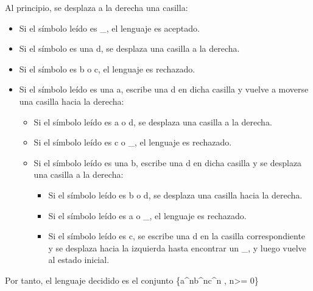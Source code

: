 \documentclass[11pt, a4paper, titlepage]{article}
\begin{document}
Al principio, se desplaza a la derecha una casilla:
\begin{itemize}
\item Si el símbolo leído es \_, el lenguaje es aceptado.
\item Si el símbolo es una d, se desplaza una casilla a la derecha.
\item Si el símbolo es b o c, el lenguaje es rechazado.
\item Si el símbolo leído es una a, escribe una d en dicha casilla
  y vuelve a moverse una casilla hacia la derecha:
  \begin{itemize}
  \item Si el símbolo leído es a o d, se desplaza una casilla a la derecha.
  \item Si el símbolo leído es c o \_, el lenguaje es rechazado.
  \item Si el símbolo leído es una b, escribe una d en dicha casilla
    y se desplaza una casilla a la derecha:
    \begin{itemize}
    \item Si el símbolo leído es b o d, se desplaza una casilla hacia la derecha.
    \item Si el símbolo leído es a o \_, el lenguaje es rechazado.
    \item Si el símbolo leído es c, se escribe una d en la casilla correspondiente
      y se desplaza hacia la izquierda hasta encontrar un \_, y luego vuelve al
      estado inicial.
    \end{itemize}
  \end{itemize}
\end{itemize}
Por tanto, el lenguaje decidido es el conjunto \{a^nb^nc^n , n>= 0\}
\end{document}
